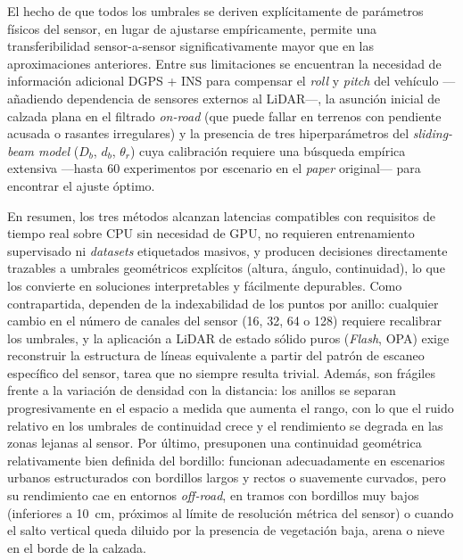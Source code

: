 El hecho de que todos los umbrales se deriven explícitamente de
parámetros físicos del sensor, en lugar de ajustarse empíricamente,
permite una transferibilidad sensor-a-sensor significativamente mayor
que en las aproximaciones anteriores. Entre sus limitaciones se
encuentran la necesidad de información adicional DGPS + INS para
compensar el \textit{roll} y \textit{pitch} del vehículo ---añadiendo
dependencia de sensores externos al LiDAR---, la asunción inicial de
calzada plana en el filtrado \textit{on-road} (que puede fallar en
terrenos con pendiente acusada o rasantes irregulares) y la presencia
de tres hiperparámetros del \textit{sliding-beam model} ($D_b$, $d_b$,
$\theta_r$) cuya calibración requiere una búsqueda empírica extensiva
---hasta 60 experimentos por escenario en el \textit{paper} original---
para encontrar el ajuste óptimo.

En resumen, los tres métodos alcanzan latencias compatibles con
requisitos de tiempo real sobre CPU sin necesidad de GPU, no requieren
entrenamiento supervisado ni \textit{datasets} etiquetados masivos, y
producen decisiones directamente trazables a umbrales geométricos
explícitos (altura, ángulo, continuidad), lo que los convierte en
soluciones interpretables y fácilmente depurables. Como contrapartida,
dependen de la indexabilidad de los puntos por anillo: cualquier cambio
en el número de canales del sensor (16, 32, 64 o 128) requiere
recalibrar los umbrales, y la aplicación a LiDAR de estado sólido puros
(\textit{Flash}, OPA) exige reconstruir la estructura de líneas
equivalente a partir del patrón de escaneo específico del sensor, tarea
que no siempre resulta trivial. Además, son frágiles frente a la
variación de densidad con la distancia: los anillos se separan
progresivamente en el espacio a medida que aumenta el rango, con lo que
el ruido relativo en los umbrales de continuidad crece y el rendimiento
se degrada en las zonas lejanas al sensor. Por último, presuponen una
continuidad geométrica relativamente bien definida del bordillo:
funcionan adecuadamente en escenarios urbanos estructurados con
bordillos largos y rectos o suavemente curvados, pero su rendimiento
cae en entornos \textit{off-road}, en tramos con bordillos muy bajos
(inferiores a 10~cm, próximos al límite de resolución métrica del
sensor) o cuando el salto vertical queda diluido por la presencia de
vegetación baja, arena o nieve en el borde de la calzada.


